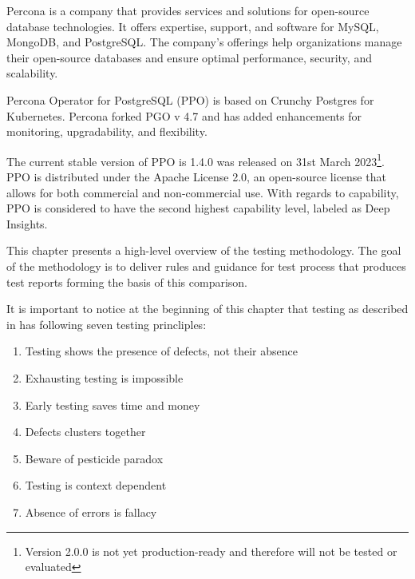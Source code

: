 Percona is a company that provides services and solutions for open-source database technologies. It offers expertise, support, and software for MySQL, MongoDB, and PostgreSQL. The company's offerings help organizations manage their open-source databases and ensure optimal performance, security, and scalability. \cite{Percona}

Percona Operator for PostgreSQL (PPO) is based on Crunchy Postgres for Kubernetes. Percona forked PGO v 4.7 and has added enhancements for monitoring, upgradability, and flexibility. \cite{PerconaBlogProsAndCons}

The current stable version of PPO is 1.4.0 was released on 31st March 2023\footnote{Version 2.0.0 is not yet production-ready and therefore will not be tested or evaluated}. \cite{PerconaDocuV2} PPO is distributed under the Apache License 2.0, an open-source license that allows for both commercial and non-commercial use. With regards to capability, PPO is considered to have the second highest capability level, labeled as Deep Insights. \cite{OperatorHubPercona}


This chapter presents a high-level overview of the testing methodology. The goal of the methodology is to deliver rules and guidance for test process that produces test reports forming the basis of this comparison.

It is important to notice at the beginning of this chapter that testing as described in \cite{FoundationOfSoftwareTesting} has following seven testing princliples:
\begin{enumerate}
  \item Testing shows the presence of defects, not their absence
  \item Exhausting testing is impossible
  \item Early testing saves time and money
  \item Defects clusters together
  \item Beware of pesticide paradox
  \item Testing is context dependent
  \item Absence of errors is fallacy
\end{enumerate}

